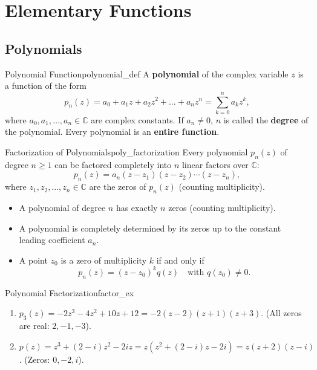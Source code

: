 \chapter{Elementary Functions}

\section{Polynomials}

\begin{definition}{Polynomial Function}{polynomial_def}
A \textbf{polynomial} of the complex variable $z$ is a function of the form
\begin{equation}
p_n(z) = a_0 + a_1 z + a_2 z^2 + \dots + a_n z^n = \sum_{k=0}^n a_k z^k,
\end{equation}
where $a_0, a_1, \dots, a_n \in \mathbb{C}$ are complex constants.
If $a_n \neq 0$, $n$ is called the \textbf{degree} of the polynomial.
Every polynomial is an \textbf{entire function}.
\end{definition}

\begin{theorem}{Factorization of Polynomials}{poly_factorization}
Every polynomial $p_n(z)$ of degree $n \ge 1$ can be factored completely into $n$ linear factors over $\mathbb{C}$:
\begin{equation}
p_n(z) = a_n(z - z_1)(z - z_2)\cdots(z - z_n),
\end{equation}
where $z_1, z_2, \dots, z_n \in \mathbb{C}$ are the zeros of $p_n(z)$ (counting multiplicity).
\begin{itemize}
    \item A polynomial of degree $n$ has exactly $n$ zeros (counting multiplicity).
    \item A polynomial is completely determined by its zeros up to the constant leading coefficient $a_n$.
    \item A point $z_0$ is a zero of multiplicity $k$ if and only if
    \begin{equation}
    p_n(z) = (z - z_0)^k q(z) \quad \text{with } q(z_0) \neq 0.
    \end{equation}
\end{itemize}
\end{theorem}

\begin{example}{Polynomial Factorization}{factor_ex}
\begin{enumerate}
    \item $p_3(z) = -2z^3 - 4z^2 + 10z + 12 = -2(z - 2)(z + 1)(z + 3)$. (All zeros are real: $2, -1, -3$).
    \item $p(z) = z^3 + (2 - i)z^2 - 2iz = z(z^2 + (2-i)z - 2i) = z(z + 2)(z - i)$. (Zeros: $0, -2, i$).
\end{enumerate}
\end{example}

